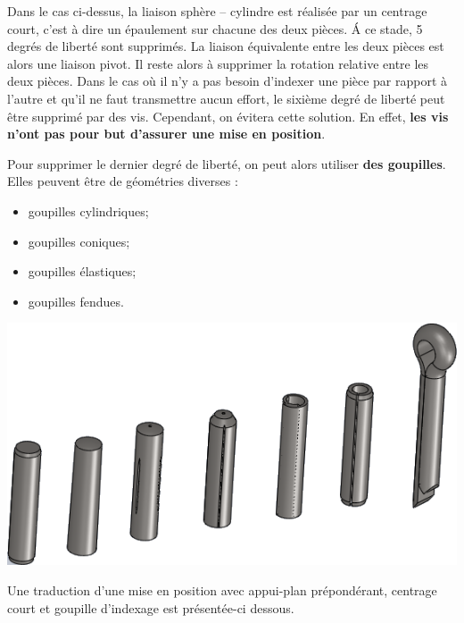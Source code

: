 \documentclass[11pt,oneside]{article}
\begin{document}
\vspace{.5cm}

Dans le cas ci-dessus, la liaison sphère -- cylindre est réalisée par un centrage court, c'est à dire un épaulement sur chacune des deux pièces. \'A ce stade, 5 degrés de liberté sont supprimés. La liaison équivalente entre les deux pièces est alors une liaison pivot. 
Il reste alors à supprimer la rotation relative entre les deux pièces. Dans le cas où il n'y a pas besoin d'indexer une pièce par rapport à l'autre et qu'il ne faut transmettre aucun effort, le sixième degré de liberté peut être supprimé par des vis. Cependant, on évitera cette solution. En effet, \textbf{les vis n'ont pas pour but d'assurer une mise en position}. 

Pour supprimer le dernier degré de liberté, on peut alors utiliser \textbf{des goupilles}. Elles 
peuvent être de géométries diverses : 

\vspace{.25cm}
\noindent \begin{minipage}[c]{.25\linewidth}
\begin{itemize}
\item goupilles cylindriques;
\item goupilles coniques;
\item goupilles élastiques;
\item goupilles fendues.
\end{itemize}
\end{minipage} \hfill
\begin{minipage}[c]{.7\linewidth}
\begin{center}
\includegraphics[width=.6\textwidth]{png/goupilles}
\end{center}
\end{minipage} 
\vspace{.25cm}

Une traduction d'une mise en position avec appui-plan prépondérant, centrage court et goupille d'indexage est présentée-ci dessous. 
\end{document}
